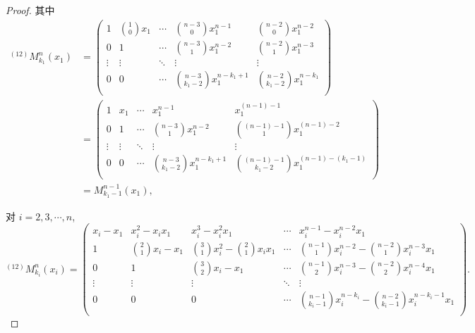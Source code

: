 \documentclass{ctexart}
\begin{document}
\begin{proof}
    其中
    \begin{align*}
        ^{(12)}M_{k_1}^n(x_1) & =\begin{pmatrix}
        1 & \binom{1}{0}x_1 & \cdots & \binom{n-3}{0}x_1^{n-1} & \binom{n-2}{0}x_1^{n-2} \\[10pt]
        0 & 1 & \cdots & \binom{n-3}{1}x_1^{n-2} & \binom{n-2}{1}x_1^{n-3} \\
        \vdots & \vdots & \ddots& \vdots  & \vdots \\[4pt]
        0 & 0 & \cdots & \binom{n-3}{k_1-2}x_1^{n-k_1+1} & \binom{n-2}{k_1-2}x_1^{n-k_1} \\
    \end{pmatrix} \\
        & =\begin{pmatrix}
        1 & x_1 & \cdots & x_1^{n-1} & x_1^{(n-1)-1} \\[6pt]
        0 & 1 & \cdots & \binom{n-3}{1}x_1^{n-2} & \binom{(n-1)-1}{1}x_1^{(n-1)-2} \\
        \vdots & \vdots & \ddots& \vdots  & \vdots \\[4pt]
        0 & 0 & \cdots & \binom{n-3}{k_1-2}x_1^{n-k_1+1} & \binom{(n-1)-1}{k_1-2}x_1^{(n-1)-(k_1-1)} \\
    \end{pmatrix} \\
        & =M_{k_1-1}^{n-1}(x_1),
    \end{align*}

    对 $i=2,3,\cdots,n$,
    \[^{(12)}M_{k_i}^n(x_i)=\begin{pmatrix}
        x_i-x_1 & x_i^2-x_ix_1 & x_i^3-x_i^2x_1 & \cdots & x_i^{n-1}-x_i^{n-2}x_1 \\[4pt]
        1 & \binom{2}{1}x_i-x_1 & \binom{3}{1}x_i^2-\binom{2}{1}x_ix_1 & \cdots & \binom{n-1}{1}x_i^{n-2}-\binom{n-2}{1}x_i^{n-3}x_1 \\[10pt]
        0 & 1 & \binom{3}{2}x_i-x_1 & \cdots & \binom{n-1}{2}x_i^{n-3}-\binom{n-2}{2}x_i^{n-4}x_1 \\
        \vdots & \vdots & \vdots & \ddots & \vdots \\[4pt]
        0 & 0 & 0 & \cdots & \binom{n-1}{k_i-1}x_i^{n-k_i}-\binom{n-2}{k_i-1}x_i^{n-k_i-1}x_1 \\
    \end{pmatrix}.\]


\end{proof}
\end{document}
